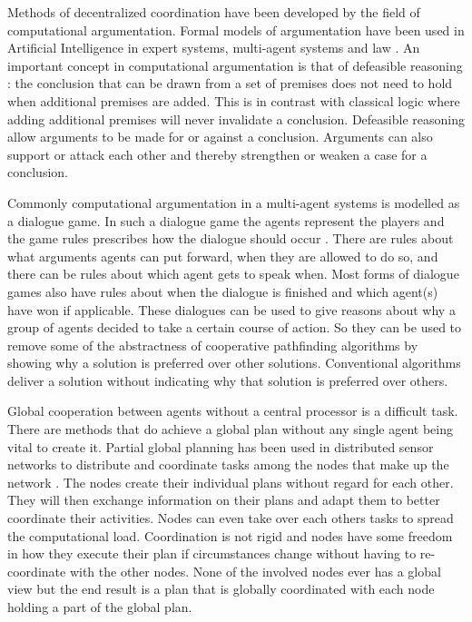 Methods of decentralized coordination have been developed by the field of 
computational argumentation. Formal models of argumentation have been used in 
Artificial Intelligence in expert systems, multi-agent systems and law
\cite{vaneemeren2014,rahwan2009}. An important concept in computational 
argumentation is that of defeasible reasoning \cite{dung1995}: the conclusion 
that can be drawn from a set of premises
does not need to hold when additional premises are added. This is in contrast
with classical logic where adding additional premises will never invalidate a
conclusion. Defeasible reasoning allow arguments to be made for or against a
conclusion. Arguments can also support or attack each other and thereby
strengthen or weaken a case for a conclusion.

Commonly computational argumentation in a multi-agent systems is modelled as a 
dialogue game.
In such a dialogue game the agents represent the players and the game rules
prescribes how the dialogue should occur \cite{walton1995}. There are rules
about what arguments agents can put forward, when they are allowed to do so,
and there can be rules about which agent gets to speak when. Most forms of
dialogue games also have rules about when the dialogue is finished and which
agent(s) have won if applicable. These dialogues can be used to give reasons
about why a group of agents decided to take a certain course of action. So they
can be used to remove some of the abstractness of cooperative pathfinding 
algorithms by showing why a solution is preferred over other solutions. 
Conventional algorithms deliver a solution without indicating why that solution 
is preferred over others.

Global cooperation between agents without a central processor is a difficult 
task. There are methods that do achieve a global plan without any single agent 
being vital to create it.
Partial global planning has been used in distributed sensor networks to
distribute and coordinate tasks among the nodes that make up the network
\cite{durfee1991}. The nodes create their individual plans without regard for
each other. They will then exchange information on their plans and adapt them
to better coordinate their activities. Nodes can even take over each others
tasks to spread the computational load. Coordination is not rigid and nodes have
some freedom in how they execute their plan if circumstances change without
having to re-coordinate with the other nodes. None of the involved nodes ever
has a global view but the end result is a plan that is globally coordinated
with each node holding a part of the global plan.

